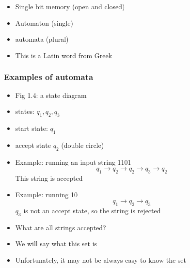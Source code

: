 \begin{frame}[allowframebreaks]
\begin{itemize}
\item Single bit memory (open and closed)
\item Automaton (single)

\item [] automata (plural)
\item This is a Latin word from Greek

\end{itemize}\end{frame} \begin{frame}[allowframebreaks] \frametitle{Examples of automata}
  \begin{itemize}
  \item Fig 1.4: a state diagram


\item [] states: $q_1, q_2, q_3$

\item [] start state: $q_1$

\item [] accept state $q_2$ (double circle)
\item Example: running an input string 1101
  \begin{equation*}
    q_1
\rightarrow q_2 \rightarrow
q_2 \rightarrow q_3 
\rightarrow q_2
\end{equation*}
This string is accepted
\item Example: running 10
    \begin{equation*}
    q_1
\rightarrow q_2 \rightarrow
q_3 
\end{equation*}
$q_3$ is not an accept state, so the string is rejected
\item What are all strings accepted?
\item [] We will say what this set is
\item [] Unfortunately, it may not be always easy to know the set

\end{itemize}\end{frame}


